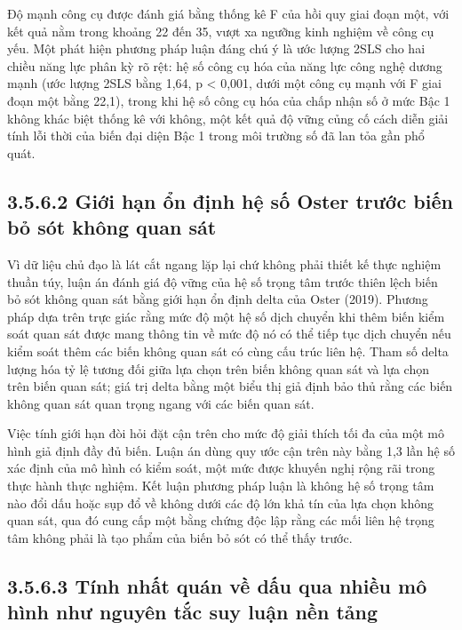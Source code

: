 \documentclass[
  a4paper,
  13pt]{extreport}
\begin{document}
Độ mạnh công cụ được đánh giá bằng thống kê F của hồi quy giai đoạn một,
với kết quả nằm trong khoảng 22 đến 35, vượt xa ngưỡng kinh nghiệm về
công cụ yếu. Một phát hiện phương pháp luận đáng chú ý là ước lượng 2SLS
cho hai chiều năng lực phân kỳ rõ rệt: hệ số công cụ hóa của năng lực
công nghệ dương mạnh (ước lượng 2SLS bằng 1,64, p \textless{} 0,001,
dưới một công cụ mạnh với F giai đoạn một bằng 22,1), trong khi hệ số
công cụ hóa của chấp nhận số ở mức Bậc 1 không khác biệt thống kê với
không, một kết quả độ vững củng cố cách diễn giải tính lỗi thời của biến
đại diện Bậc 1 trong môi trường số đã lan tỏa gần phổ quát.

\hypertarget{giux1edbi-hux1ea1n-ux1ed5n-ux111ux1ecbnh-hux1ec7-sux1ed1-oster-trux1b0ux1edbc-biux1ebfn-bux1ecf-suxf3t-khuxf4ng-quan-suxe1t}{%
\subsection{3.5.6.2 Giới hạn ổn định hệ số Oster trước biến bỏ sót không
quan
sát}\label{giux1edbi-hux1ea1n-ux1ed5n-ux111ux1ecbnh-hux1ec7-sux1ed1-oster-trux1b0ux1edbc-biux1ebfn-bux1ecf-suxf3t-khuxf4ng-quan-suxe1t}}

Vì dữ liệu chủ đạo là lát cắt ngang lặp lại chứ không phải thiết kế thực
nghiệm thuần túy, luận án đánh giá độ vững của hệ số trọng tâm trước
thiên lệch biến bỏ sót không quan sát bằng giới hạn ổn định delta của
Oster (2019). Phương pháp dựa trên trực giác rằng mức độ một hệ số dịch
chuyển khi thêm biến kiểm soát quan sát được mang thông tin về mức độ nó
có thể tiếp tục dịch chuyển nếu kiểm soát thêm các biến không quan sát
có cùng cấu trúc liên hệ. Tham số delta lượng hóa tỷ lệ tương đối giữa
lựa chọn trên biến không quan sát và lựa chọn trên biến quan sát; giá
trị delta bằng một biểu thị giả định bảo thủ rằng các biến không quan
sát quan trọng ngang với các biến quan sát.

Việc tính giới hạn đòi hỏi đặt cận trên cho mức độ giải thích tối đa của
một mô hình giả định đầy đủ biến. Luận án dùng quy ước cận trên này bằng
1,3 lần hệ số xác định của mô hình có kiểm soát, một mức được khuyến
nghị rộng rãi trong thực hành thực nghiệm. Kết luận phương pháp luận là
không hệ số trọng tâm nào đổi dấu hoặc sụp đổ về không dưới các độ lớn
khả tín của lựa chọn không quan sát, qua đó cung cấp một bằng chứng độc
lập rằng các mối liên hệ trọng tâm không phải là tạo phẩm của biến bỏ
sót có thể thấy trước.

\hypertarget{tuxednh-nhux1ea5t-quuxe1n-vux1ec1-dux1ea5u-qua-nhiux1ec1u-muxf4-huxecnh-nhux1b0-nguyuxean-tux1eafc-suy-luux1eadn-nux1ec1n-tux1ea3ng}{%
\subsection{3.5.6.3 Tính nhất quán về dấu qua nhiều mô hình như nguyên
tắc suy luận nền
tảng}\label{tuxednh-nhux1ea5t-quuxe1n-vux1ec1-dux1ea5u-qua-nhiux1ec1u-muxf4-huxecnh-nhux1b0-nguyuxean-tux1eafc-suy-luux1eadn-nux1ec1n-tux1ea3ng}}
\end{document}
